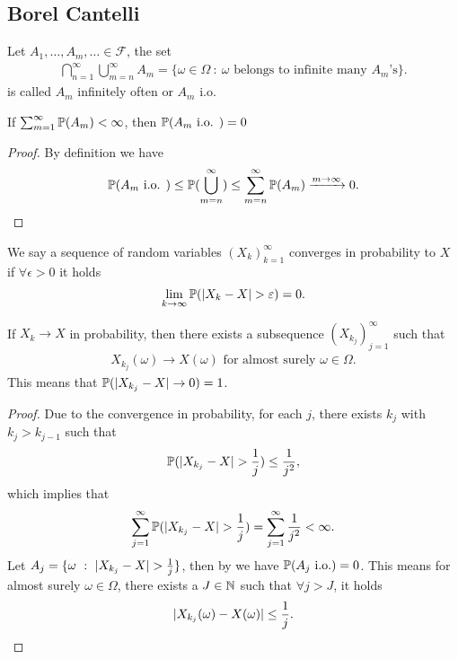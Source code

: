 \subsection{Borel Cantelli}
\begin{definition}
 Let $A_{1},\ldots ,A_m,\ldots \in \mathcal{F}$, the set 
 \begin{align*}
   \bigcap_{n=1}^{\infty}\bigcup_{m=n}^{\infty} A_m = \{\omega \in \Omega  \ : \ \omega  \text{ belongs to infinite many } A_{m}\text{'s}\}  
 .\end{align*}
 is called $A_m$ infinitely often or $A_m$ i.o.
\end{definition}
\begin{lemma}\label{borel_cantelli}
 If $\sum_{m=1}^{\infty} \P(A_m) < \infty  $,  then $\P(A_m \text{ i.o. }) = 0$
\end{lemma}
\begin{proof}
 By definition we have 
 \begin{align*}
   \P(A_m \text{ i.o. }) \le  \P(\bigcup_{m=n}^{\infty} ) \le \sum_{m=n}^{\infty} \P(A_m)  \xrightarrow{m\to \infty} 0
 .\end{align*}
\end{proof}
\begin{definition}
  We say a sequence of random variables $(X_k)_{k=1}^{\infty} $  converges in probability to $X$ if 
  $\forall  \epsilon > 0$ it holds
  \begin{align*}
    \lim_{k\to \infty} \P(\abs{X_k - X} > \epsilon ) = 0 
  .\end{align*}
\end{definition}
\begin{theorem}
 If $X_k \to  X$  in probability, then there exists 
 a subsequence $(X_{k_j})_{j=1}^{\infty} $ such that 
 \begin{align*}
   X_{k_j}(\omega ) \to X(\omega ) \text{ for almost surely } \omega \in  \Omega 
 .\end{align*}
 This means that $\P(\abs{X_{k_j}-X}\to 0) = 1$.
\end{theorem}
\begin{proof}
  Due to the convergence in probability, for each $j$, there exists $k_j$ with $k_j>k_{j-1}$ such that
  \begin{align*}
    \P(\abs{X_{k_j} - X} > \frac{1}{j}) \le \frac{1}{j^2}
  ,\end{align*}
  which implies that
  \begin{align*}
    \sum_{j=1}^{\infty} \P(\abs{X_{k_j}-X} > \frac{1}{j}) = \sum_{j=1}^{\infty} \frac{1}{j^2}   < \infty
  .\end{align*}
  Let $A_j = \{\omega  \ : \ \abs{X_{k_j}-X} > \frac{1}{j}\}  $, then by  we have $\P(A_j\text{ i.o.}) = 0$. This means for almost surely $\omega  \in  \Omega$, there exists a $J\in\N$ such that $\forall  j>J$,
  it holds 
  \begin{align*}
    \abs{X_{k_j}(\omega ) - X(\omega )} \le  \frac{1}{j}
  .\end{align*}
\end{proof}
